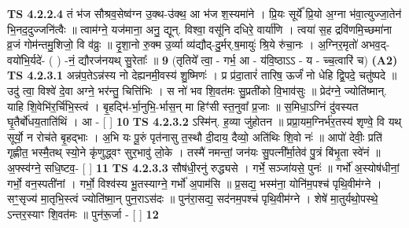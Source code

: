 \documentclass[17pt]{extarticle}
\begin{document}
                  \newline
                                \textbf{ TS 4.2.2.4} \newline
                  तं भ॑ज सौश्रव॒सेष्व॑ग्न उ॒क्थ-उ॑क्थ॒ आ भ॑ज श॒स्यमा॑ने । प्रि॒यः सूर्ये᳚ प्रि॒यो अ॒ग्ना भ॑वा॒त्युज्जा॒तेन॑ भि॒नद॒दुज्जनि॑त्वैः ॥ त्वाम॑ग्ने॒ यज॑माना॒ अनु॒ द्यून्. विश्वा॒ वसू॑नि दधिरे॒ वार्या॑णि । त्वया॑ स॒ह द्रवि॑णमि॒च्छमा॑ना व्र॒जं गोम॑न्तमु॒शिजो॒ वि व॑व्रुः ॥ दृ॒शा॒नो रु॒क्म उ॒र्व्या व्य॑द्यौद्-दु॒र्मर्.ष॒मायुः॑ श्रि॒ये रु॑चा॒नः । अ॒ग्निर॒मृतो॑ अभव॒द्-वयो॑भि॒र्यदे॑- ( ) -नं॒ द्यौरज॑नयथ् सु॒रेताः᳚ ॥ \textbf{  9} \newline
                  \newline
                      (तृतिये᳚ त्वा॒ - गर्भ॒ आ - य॑वि॒ष्ठाऽऽ - य - च्च॒त्वारि॑ च)  \textbf{(A2)} \newline \newline
                                        \textbf{ TS 4.2.3.1} \newline
                  अन्न॑प॒तेऽन्न॑स्य नो देह्यनमी॒वस्य॑ शु॒ष्मिणः॑ । प्र प्र॑दा॒तारं॑ तारिष॒ ऊर्जं॑ नो धेहि द्वि॒पदे॒ चतु॑ष्पदे ॥ उदु॑ त्वा॒ विश्वे॑ दे॒वा अग्ने॒ भर॑न्तु॒ चित्ति॑भिः । स नो॑ भव शि॒वत॑मः सु॒प्रती॑को वि॒भाव॑सुः ॥ प्रेद॑ग्ने॒ ज्योति॑ष्मान्. याहि शि॒वेभि॑र॒र्चि॑भि॒स्त्वं । बृ॒हद्भि॑-र्भा॒नुभि॒-र्भास॒न् मा हिꣳ॑सी स्त॒नुवा᳚ प्र॒जाः ॥ स॒मिधा॒ऽग्निं दु॑वस्यत घृ॒तैर्बो॑धय॒ताति॑थिं । आ - [  ] \textbf{  10} \newline
                  \newline
                                \textbf{ TS 4.2.3.2} \newline
                  ऽस्मि॑न्. ह॒व्या जु॑होतन ॥ प्रप्रा॒यम॒ग्निर्भ॑र॒तस्य॑ शृण्वे॒ वि यथ् सूर्यो॒ न रोच॑ते बृ॒हद्भाः । अ॒भि यः पू॒रुं पृत॑नासु त॒स्थौ दी॒दाय॒ दैव्यो॒ अति॑थिः शि॒वो नः॑ ॥ आपो॑ देवीः॒ प्रति॑ गृह्णीत॒ भस्मै॒तथ् स्यो॒ने कृ॑णुद्ध्वꣳ सुर॒भावु॑ लो॒के । तस्मै॑ नमन्तां॒ जन॑यः सु॒पत्नी᳚र्मा॒तेव॑ पु॒त्रं बि॑भृ॒ता स्वे॑नं ॥ अ॒फ्स्व॑ग्ने॒ सधि॒ष्टव॒- [  ] \textbf{  11} \newline
                  \newline
                                \textbf{ TS 4.2.3.3} \newline
                  सौष॑धी॒रनु॑ रुद्ध्यसे । गर्भे॒ सञ्जा॑यसे॒ पुनः॑ ॥ गर्भो॑ अ॒स्योष॑धीनां॒ गर्भो॒ वन॒स्पती॑नां । गर्भो॒ विश्व॑स्य भू॒तस्याग्ने॒ गर्भो॑ अ॒पाम॑सि ॥ प्र॒सद्य॒ भस्म॑ना॒ योनि॑म॒पश्च॑ पृथि॒वीम॑ग्ने । सꣳ॒॒सृज्य॑ मा॒तृभि॒स्त्वं ज्योति॑ष्मा॒न् पुन॒राऽस॑दः ॥ पुन॑रा॒सद्य॒ सद॑नम॒पश्च॑ पृथि॒वीम॑ग्ने । शेषे॑ मा॒तुर्यथो॒पस्थे॒ ऽन्तर॒स्याꣳ शि॒वत॑मः ॥ पुन॑रू॒र्जा - [  ] \textbf{  12} \newline
\end{document}
